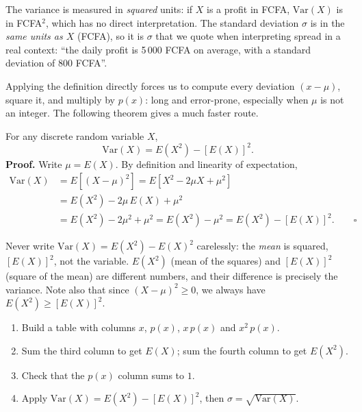 \documentclass[11pt]{article}
\newcounter{popsec}
\newcounter{popsub}
\newcommand{\courssub}[1]{%
  \stepcounter{popsub}%
  \par\vspace{9pt}\noindent{\popxbold\fontsize{11.5}{13}\selectfont\color{popink}{\color{poporange}\thepopsec.\thepopsub}\hspace{6pt}#1}\par\nopagebreak\vspace{4pt}
}
\begin{document}
\begin{attention}[Units]
The variance is measured in \emph{squared} units: if $X$ is a profit in FCFA, $\mathrm{Var}(X)$ is in FCFA$^2$, which has no direct interpretation. The standard deviation $\sigma$ is in the \emph{same units as $X$} (FCFA), so it is $\sigma$ that we quote when interpreting spread in a real context: ``the daily profit is 5\,000 FCFA on average, with a standard deviation of 800 FCFA''.
\end{attention}

\courssub{The computational formula}

Applying the definition directly forces us to compute every deviation $(x-\mu)$, square it, and multiply by $p(x)$: long and error-prone, especially when $\mu$ is not an integer. The following theorem gives a much faster route.

\begin{propriete}
For any discrete random variable $X$,
\[ \mathrm{Var}(X) = E(X^2) - [E(X)]^2. \]
\textbf{Proof.} Write $\mu = E(X)$. By definition and linearity of expectation,
\begin{align*}
\mathrm{Var}(X) &= E\!\left[(X-\mu)^2\right] = E\!\left[X^2 - 2\mu X + \mu^2\right] \\
&= E(X^2) - 2\mu\,E(X) + \mu^2 \\
&= E(X^2) - 2\mu^2 + \mu^2 = E(X^2) - \mu^2 = E(X^2) - [E(X)]^2. \qquad\square
\end{align*}
\end{propriete}

\begin{attention}
Never write $\mathrm{Var}(X) = E(X^2) - E(X)^2$ carelessly: the \emph{mean} is squared, $[E(X)]^2$, not the variable. $E(X^2)$ (mean of the squares) and $[E(X)]^2$ (square of the mean) are different numbers, and their difference is precisely the variance. Note also that since $(X-\mu)^2 \ge 0$, we always have $E(X^2) \ge [E(X)]^2$.
\end{attention}

\begin{methode}
\begin{enumerate}
\item Build a table with columns $x$, $p(x)$, $x\,p(x)$ and $x^2\,p(x)$.
\item Sum the third column to get $E(X)$; sum the fourth column to get $E(X^2)$.
\item Check that the $p(x)$ column sums to $1$.
\item Apply $\mathrm{Var}(X) = E(X^2) - [E(X)]^2$, then $\sigma = \sqrt{\mathrm{Var}(X)}$.
\end{enumerate}
\end{methode}
\end{document}
